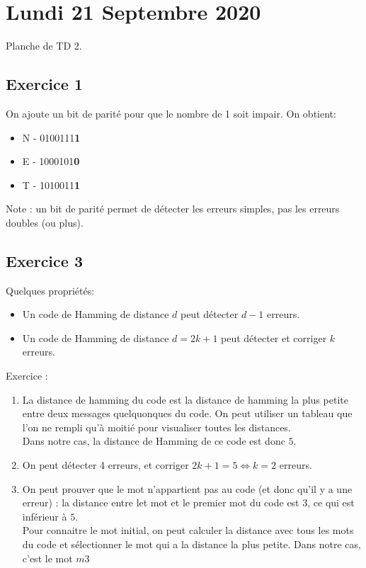\section{Lundi 21 Septembre 2020}

Planche de TD 2.

\subsection{Exercice 1}

On ajoute un bit de parité pour que le nombre de 1 soit impair. On obtient:

\begin{itemize}
\item N - 0100111\textbf{1}
\item E - 1000101\textbf{0}
\item T - 1010011\textbf{1}
\end{itemize}

Note : un bit de parité permet de détecter les erreurs simples, pas les erreurs doubles (ou plus).

\subsection{Exercice 3}

Quelques propriétés:
\begin{itemize}
	\item Un code de Hamming de distance $d$ peut détecter $d-1$ erreurs.
	\item Un code de Hamming de distance $d = 2k+1$ peut détecter et corriger $k$ erreurs.
\end{itemize}

Exercice :

\begin{enumerate}
	\item La distance de hamming du code est la distance de hamming la plus petite entre deux messages quelquonques du code. On peut utiliser un tableau que l'on ne rempli qu'à moitié pour visualiser toutes les distances. \\ Dans notre cas, la distance de Hamming de ce code est donc $5$.
	\item On peut détecter 4 erreurs, et corriger $2k+1=5 \iff k=2$ erreurs.
	\item On peut prouver que le mot n'appartient pas au code (et donc qu'il y a une erreur) : la distance entre let mot et le premier mot du code est $3$, ce qui est inférieur à $5$. \\ Pour connaitre le mot initial, on peut calculer la distance avec tous les mots du code et sélectionner le mot qui a la distance la plus petite. Dans notre cas, c'est le mot $m3$
\end{enumerate}

